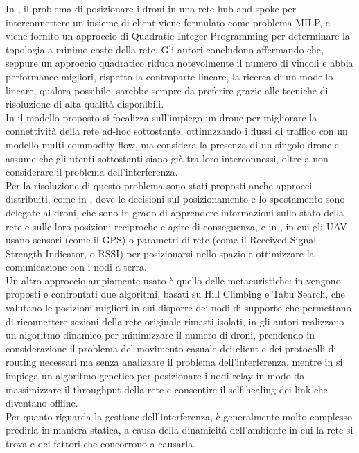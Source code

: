 In \cite{6564778}, il problema di posizionare i droni in una rete hub-and-spoke per interconnettere un insieme di client viene formulato come problema MILP, e viene fornito un approccio di Quadratic Integer Programming per determinare la topologia a minimo costo della rete.
Gli autori concludono affermando che, seppure un approccio quadratico riduca notevolmente il numero di vincoli e abbia performance migliori, rispetto la controparte lineare, la ricerca di un modello lineare, qualora possibile, sarebbe sempre da preferire grazie alle tecniche di risoluzione di alta qualità disponibili.\\
In \cite{4455114} il modello proposto si focalizza sull'impiego un drone per migliorare la connettività della rete ad-hoc sottostante, ottimizzando i flussi di traffico con un modello multi-commodity flow, ma considera la presenza di un singolo drone e assume che gli utenti sottostanti siano già tra loro interconnessi, oltre a non considerare il problema dell'interferenza. \\
Per la risoluzione di questo problema sono stati proposti anche approcci distribuiti, come in \cite{Correll09ad-hocwireless}, dove le decisioni sul posizionamento e lo spostamento sono delegate ai droni, che sono in grado di apprendere informazioni sullo stato della rete e sulle loro posizioni reciproche e agire di conseguenza, e in \cite{6162393}, in cui gli UAV usano sensori (come il GPS) o parametri di rete (come il Received Signal Strength Indicator, o RSSI) per posizionarsi nello spazio e ottimizzare la comunicazione con i nodi a terra. \\
Un altro approccio ampiamente usato è quello delle metaeuristiche: in \cite{5983050} vengono proposti e confrontati due algoritmi, basati su Hill Climbing e Tabu Search, che valutano le posizioni migliori in cui disporre dei nodi di supporto che permettano di riconnettere sezioni della rete originale rimasti isolati, in \cite{1495151} gli autori realizzano un algoritmo dinamico per minimizzare il numero di droni, prendendo in considerazione il problema del movimento casuale dei client e dei protocolli di routing necessari ma senza analizzare il problema dell'interferenza, mentre in \cite{Rohde20131893} si impiega un algoritmo genetico per posizionare i nodi relay in modo da massimizzare il throughput della rete e consentire il self-healing dei link che diventano offline. \\     
Per quanto riguarda la gestione dell'interferenza, è generalmente molto complesso predirla in maniera statica, a causa della dinamicità dell'ambiente in cui la rete si trova e dei fattori che concorrono a causarla.

